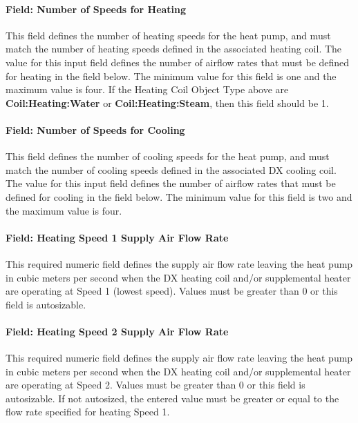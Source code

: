 \paragraph{Field: Number of Speeds for Heating}\label{field-number-of-speeds-for-heating-1}

This field defines the number of heating speeds for the heat pump, and must match the number of heating speeds defined in the associated heating coil. The value for this input field defines the number of airflow rates that must be defined for heating in the field below. The minimum value for this field is one and the maximum value is four. If the Heating Coil Object Type above are \textbf{Coil:Heating:Water} or \textbf{Coil:Heating:Steam}, then this field should be 1.

\paragraph{Field: Number of Speeds for Cooling}\label{field-number-of-speeds-for-cooling-1}

This field defines the number of cooling speeds for the heat pump, and must match the number of cooling speeds defined in the associated DX cooling coil. The value for this input field defines the number of airflow rates that must be defined for cooling in the field below. The minimum value for this field is two and the maximum value is four.

\paragraph{Field: Heating Speed 1 Supply Air Flow Rate}\label{field-heating-speed-1-supply-air-flow-rate}

This required numeric field defines the supply air flow rate leaving the heat pump in cubic meters per second when the DX heating coil and/or supplemental heater are operating at Speed 1 (lowest speed). Values must be greater than 0 or this field is autosizable.

\paragraph{Field: Heating Speed 2 Supply Air Flow Rate}\label{field-heating-speed-2-supply-air-flow-rate}

This required numeric field defines the supply air flow rate leaving the heat pump in cubic meters per second when the DX heating coil and/or supplemental heater are operating at Speed 2. Values must be greater than 0 or this field is autosizable. If not autosized, the entered value must be greater or equal to the flow rate specified for heating Speed 1.

